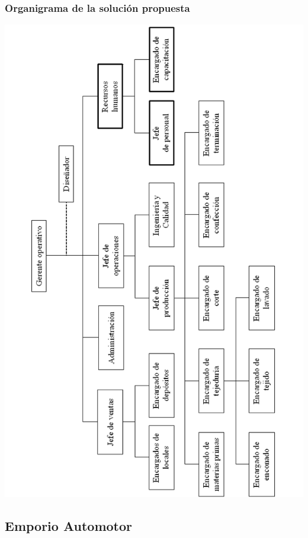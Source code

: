 \documentclass[a4paper,10pt,titlepage]{article}
\begin{document}
\subsubsection{Organigrama de la soluci\'on propuesta}
	\begin{center}
	\includegraphics[width=415pt]{./Organigramas/DollyOrganigramaSolucion.png}
	\end{center}


\newpage
\subsection{Emporio Automotor}
\vspace{0.5cm}
\end{document}
